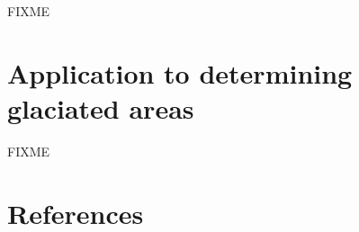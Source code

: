 \documentclass[]{interact}
\theoremstyle{plain}%
\theoremstyle{definition}
\theoremstyle{remark}
\begin{document}
FIXME

\section{Application to determining glaciated areas} \label{sec:app}


FIXME




\section{References}





\end{document}
